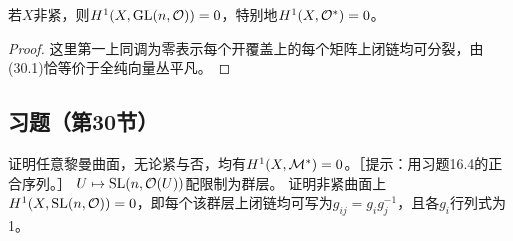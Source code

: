 若$X$非紧，则$H^1(X,\operatorname{GL}(n,\mathcal O))=0$，特别地$H^1(X,\mathcal O^*)=0$。
\begin{proof}
这里第一上同调为零表示每个开覆盖上的每个矩阵上闭链均可分裂，由(30.1)恰等价于全纯向量丛平凡。
\end{proof}
\subsection*{习题（第30节）}
证明任意黎曼曲面，无论紧与否，均有$H^1(X,\mathcal M^*)=0$。［提示：用习题16.4的正合序列。］
$U\mapsto\operatorname{SL}(n,\mathcal O(U))$配限制为群层。
证明非紧曲面上$H^1(X,\operatorname{SL}(n,\mathcal O))=0$，即每个该群层上闭链均可写为$g_{ij}=g_ig_j^{-1}$，且各$g_i$行列式为1。
